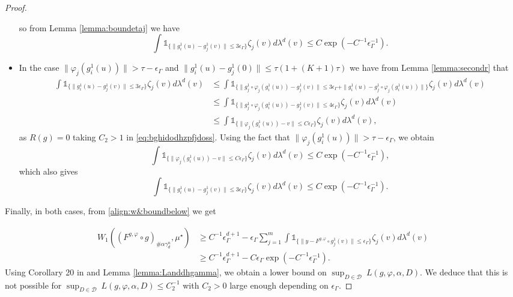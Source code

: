 \documentclass[10pt]{article}
\begin{document}
\begin{proof}
\begin{itemize}
so from Lemma \ref{lemma:boundetaj} we have 
$$\int \mathds{1}_{\{\|g_i^1(u)-g_j^1(v)\|\leq 3\epsilon_\Gamma\}}\zeta_j(v)d\lambda^d(v)\leq C\exp(-C^{-1}\epsilon_\Gamma^{-1}).$$
\item
In the case $\|\varphi_j(g_i^1(u))\| > \tau -\epsilon_\Gamma$ and $\|g_i^1(u)-g_j^1(0)\|\leq \tau(1+(K+1)\tau)$ we have from Lemma \ref{lemma:secondr} that
\begin{align*}
    \int \mathds{1}_{\{\|g_i^1(u)-g_j^1(v)\|\leq 3\epsilon_\Gamma\}}\zeta_j(v)d\lambda^d(v)& \leq \int \mathds{1}_{\{\|g_j^1\circ \varphi_j(g_i^1(u))-g_j^1(v)\|\leq 3\epsilon_\Gamma+\|g_i^1(u)-g_j^1\circ \varphi_j(g_i^1(u))\|\}}\zeta_j(v)d\lambda^d(v)\\
    & \leq \int \mathds{1}_{\{\|g_j^1\circ \varphi_j(g_i^1(u))-g_j^1(v)\|\leq 4\epsilon_\Gamma\}}\zeta_j(v)d\lambda^d(v)\\
    & \leq \int \mathds{1}_{\{\|\varphi_j(g_i^1(u))-v\|\leq C\epsilon_\Gamma\}}\zeta_j(v)d\lambda^d(v),
\end{align*}
as $R(g)=0$ taking $C_2>1$ in \eqref{eq:bghidodhzpfjdoss}. Using the fact that $\|\varphi_j(g_i^1(u))\| > \tau -\epsilon_\Gamma$, we obtain
$$\int \mathds{1}_{\{\|\varphi_j(g_i^1(u))-v\|\leq C\epsilon_\Gamma\}}\zeta_j(v)d\lambda^d(v)\leq C\exp(-C^{-1}\epsilon_\Gamma^{-1}),$$
which also gives 
$$\int \mathds{1}_{\{\|g_i^1(u)-g_j^1(v)\|\leq 3\epsilon_\Gamma\}}\zeta_j(v)d\lambda^d(v)\leq C\exp(-C^{-1}\epsilon_\Gamma^{-1}).$$
\end{itemize}
Finally, in both cases, from \eqref{align:w&boundbelow} we get


\begin{align}\label{align:boundwassepsi}
    W_1((F^{g,\varphi}\circ g)_{\# \alpha \gamma_d^n},\mu^\star)
    & \geq C^{-1}\epsilon_\Gamma^{d+1}-\epsilon_\Gamma\sum_{j=1}^m\int \mathds{1}_{\{\|y-F^{g,\varphi}\circ g_j^1(v)\|\leq \epsilon_\Gamma\}}\zeta_j(v)d\lambda^d(v)\nonumber\\
    & \geq C^{-1}\epsilon_\Gamma^{d+1}-C\epsilon_\Gamma\exp(-C^{-1}\epsilon_\Gamma^{-1}).
\end{align}
Using Corollary 20 in \cite{stephanovitch2024ipm} and Lemma \ref{lemma:Landdhgamma}, we obtain a lower bound on $\sup_{D\in \mathcal{D}} \ L(g,\varphi,\alpha,D).$ 
We deduce 
that this is not possible for $\sup_{D\in \mathcal{D}} \ L(g,\varphi,\alpha,D)\leq C_2^{-1}$ with $C_2>0$ large enough depending on $\epsilon_\Gamma$.
\end{proof}
\end{document}
